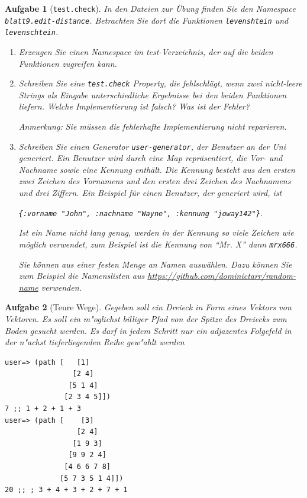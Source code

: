 \documentclass[11pt,a4paper]{article}
\newcounter{numb}
\theoremstyle{break}
\newtheorem{aufgabe}{Aufgabe}[numb]
\begin{document}
\begin{aufgabe}[\texttt{test.check}]

In den Dateien zur \"Ubung finden Sie den Namespace \verb|blatt9.edit-distance|.
Betrachten Sie dort die Funktionen \verb|levenshtein| und \verb|levenschtein|.

\begin{enumerate}[label=\alph*)]
    \item Erzeugen Sie einen Namespace im test-Verzeichnis,
        der auf die beiden Funktionen zugreifen kann.

    \item Schreiben Sie eine \verb|test.check| Property,
        die fehlschl\"agt, wenn zwei nicht-leere
        Strings als Eingabe unterschiedliche Ergebnisse bei den beiden Funktionen liefern.
        Welche Implementierung ist falsch?
        Was ist der Fehler? 
        
        Anmerkung: Sie m\"ussen die fehlerhafte Implementierung nicht reparieren.

    \item 
        Schreiben Sie einen Generator \verb|user-generator|, der Benutzer an der Uni generiert.
        Ein Benutzer wird durch eine Map repr\"asentiert,
        die Vor- und Nachname sowie eine Kennung enth\"alt.
        Die Kennung besteht aus den ersten zwei Zeichen des Vornamens
        und den ersten drei Zeichen des Nachnamens und drei Ziffern.
        Ein Beispiel f\"ur einen Benutzer, der generiert wird, ist
        
        \verb|{:vorname "John", :nachname "Wayne", :kennung "joway142"}|.

        Ist ein Name nicht lang genug, werden in der Kennung so viele Zeichen wie m\"oglich verwendet, zum Beispiel
        ist die Kennung von \enquote{Mr. X} dann \verb|mrx666|.
        

		Sie k\"onnen aus einer festen Menge an Namen ausw\"ahlen.
        Dazu k\"onnen Sie zum Beispiel die Namenslisten aus
        \url{https://github.com/dominictarr/random-name} verwenden.
\end{enumerate}
\end{aufgabe}

\begin{aufgabe}[Teure Wege]
Gegeben soll ein Dreieck in Form eines Vektors von Vektoren. Es soll ein m"oglichst billiger Pfad von der Spitze des Dreiecks zum Boden gesucht werden. Es darf in jedem Schritt nur ein adjazentes Folgefeld in der n"achst tieferliegenden Reihe gew"ahlt werden

\enlargethispage{2\baselineskip}
\begin{verbatim}
user=> (path [   [1]
                [2 4]
               [5 1 4]
              [2 3 4 5]])
7 ;; 1 + 2 + 1 + 3
user=> (path [    [3]
                 [2 4]
                [1 9 3]
               [9 9 2 4]
              [4 6 6 7 8]
             [5 7 3 5 1 4]])
20 ;; ; 3 + 4 + 3 + 2 + 7 + 1

\end{verbatim}
\end{aufgabe}
\end{document}

